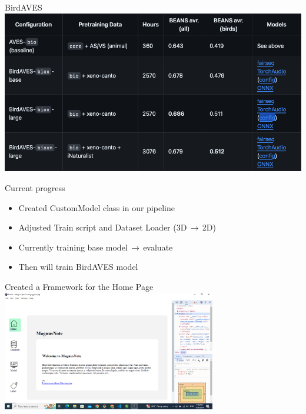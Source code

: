 \begin{frame}{BirdAVES}
    \centering
    \includegraphics[height=0.7\textheight,width=1\textwidth,keepaspectratio]{images/BirdAves.png}  
\end{frame}

\begin{frame}{Current progress}
    \begin{itemize}
        \item Created CustomModel class in our pipeline
        \item Adjusted Train script and Dataset Loader (3D$ \,\to\, $2D)
        \item Currently training base model$ \,\to\, $evaluate
        \item Then will train BirdAVES model
    \end{itemize}
\end{frame}


\begin{frame}{Created a Framework for the Home Page}
    \centering
    \includegraphics[height=0.7\textheight,width=0.7\textwidth,keepaspectratio]{homepage.png}  
\end{frame}

